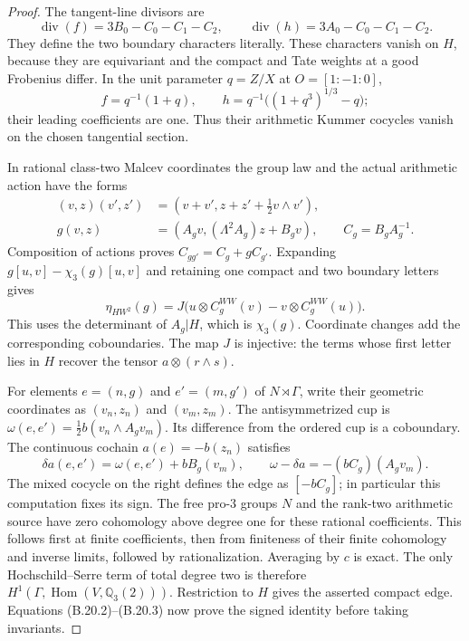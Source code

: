 \begin{proof}
The tangent-line divisors are
\[
 \operatorname{div}(f)=3B_0-C_0-C_1-C_2,\qquad
 \operatorname{div}(h)=3A_0-C_0-C_1-C_2.
\]
They define the two boundary characters literally. These
characters vanish on $H$, because they are equivariant and
the compact and Tate weights at a good Frobenius differ.
In the unit parameter $q=Z/X$ at $O=[1:-1:0]$,
\[
 f=q^{-1}(1+q),\qquad
 h=q^{-1}\bigl((1+q^3)^{1/3}-q\bigr);
\]
their leading coefficients are one. Thus their arithmetic
Kummer cocycles vanish on the chosen tangential section.

In rational class-two Malcev coordinates the group law and
the actual arithmetic action have the forms
\[
\begin{aligned}
 (v,z)(v',z')&=(v+v',z+z'+\tfrac12v\wedge v'),\\
 g(v,z)&=(A_gv,(\Lambda^2A_g)z+B_gv),\qquad
 C_g=B_gA_g^{-1}.
\end{aligned}
\]
Composition of actions proves $C_{gg'}=C_g+gC_{g'}$.
Expanding $g[u,v]-\chi_3(g)[u,v]$ and retaining one
compact and two boundary letters gives
\[
 \eta_{HW^2}(g)=
 J\bigl(u\otimes C_g^{WW}(v)-v\otimes C_g^{WW}(u)\bigr).
                                                               \tag{B.20.2}
\]
This uses the determinant of $A_g|H$, which is $\chi_3(g)$.
Coordinate changes add the corresponding coboundaries.
The map $J$ is injective: the terms whose first letter lies
in $H$ recover the tensor $a\otimes(r\wedge s)$.

For elements $e=(n,g)$ and $e'=(m,g')$ of
$N\rtimes\Gamma$, write their geometric coordinates as
$(v_n,z_n)$ and $(v_m,z_m)$. The antisymmetrized cup is
$\omega(e,e')=\tfrac12 b(v_n\wedge A_gv_m)$.
Its difference from the ordered cup is a coboundary.
The continuous cochain $a(e)=-b(z_n)$ satisfies
\[
 \delta a(e,e')=\omega(e,e')+bB_g(v_m),
 \qquad
 \omega-\delta a=-(bC_g)(A_gv_m).                               \tag{B.20.3}
\]
The mixed cocycle on the right defines the edge as
$[-bC_g]$; in particular this computation fixes its sign.
The free pro-$3$ groups $N$ and the rank-two arithmetic
source have zero cohomology above degree one for these
rational coefficients. This follows first at finite
coefficients, then from finiteness of their finite
cohomology and inverse limits, followed by rationalization.
Averaging by $c$ is exact. The only Hochschild--Serre term
of total degree two is therefore
$H^1(\Gamma,\operatorname{Hom}(V,\mathbb Q_3(2)))$.
Restriction to $H$ gives the asserted compact edge.
Equations (B.20.2)--(B.20.3) now prove the signed identity
before taking invariants.


\end{proof}
